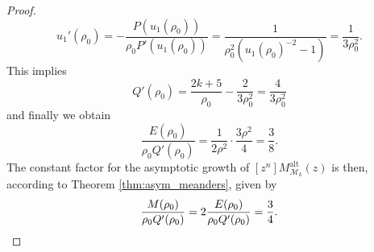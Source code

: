 \begin{proof}
  $$
  u_1'(\rho_0) = - \frac{P(u_1(\rho_0))}{\rho_0 P'(u_1(\rho_0))} 
  = \frac{1}{\rho_0^2(u_1(\rho_0)^{-2} - 1)}
  = \frac{1}{3\rho_0^2}.
  $$
  This implies
  $$
    Q'(\rho_0) = \frac{2k+5}{\rho_0} - \frac{2}{3\rho_0^2} 
    = \frac{4}{3\rho_0^2} 
  $$
  and finally we obtain
  $$
    \frac{E(\rho_0)}{\rho_0 Q'(\rho_0)} = 
    \frac{1}{2 \rho^2} \cdot \frac{3 \rho^2}{4} = \frac{3}{8}.
  $$
  The constant factor for the asymptotic growth of $[z^n]M_{\mathcal{M}_k}^\mathrm{alt}(z)$ is then, according to Theorem \ref{thm:asym_meanders}, given by
  \begin{equation*}
    \frac{M(\rho_0)}{\rho_0 Q'(\rho_0)} = 2 \frac{E(\rho_0)}{\rho_0 Q'(\rho_0)} = \frac{3}{4}. \qedhere
  \end{equation*}
\end{proof}

% 